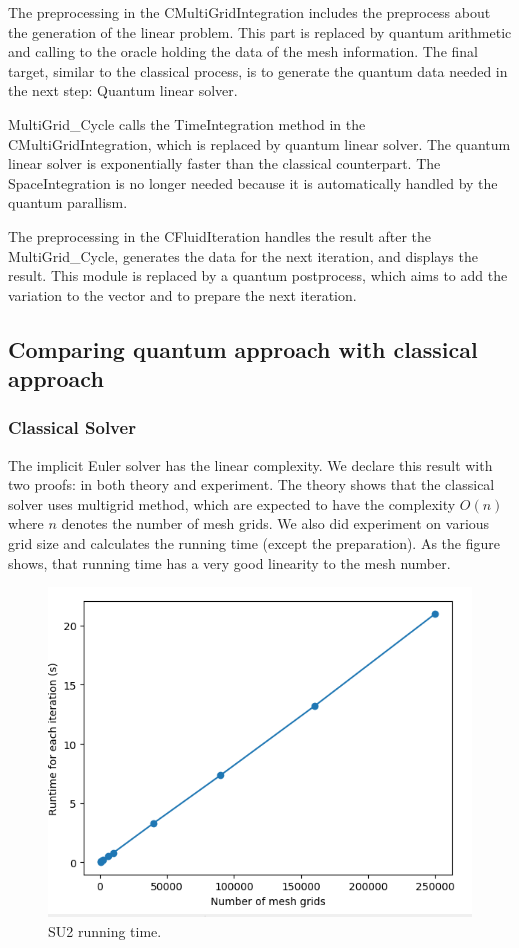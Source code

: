 \documentclass[%
 reprint,
 amsmath,amssymb,
pra,
]{revtex4-1}
\begin{document}
The preprocessing in the CMultiGridIntegration includes the preprocess about the generation of the linear problem. This part is replaced by quantum arithmetic and calling to the oracle holding the data of the mesh information. The final target, similar to the classical process, is to generate the quantum data needed in the next step: Quantum linear solver.

MultiGrid\_Cycle calls the TimeIntegration method in the CMultiGridIntegration, which is replaced by quantum linear solver. The quantum linear solver is exponentially faster than the classical counterpart. The SpaceIntegration is no longer needed because it is automatically handled by the quantum parallism.

The preprocessing in the CFluidIteration handles the result after the MultiGrid\_Cycle, generates the data for the next iteration, and displays the result. This module is replaced by a quantum postprocess, which aims to add the variation to the vector and to prepare the next iteration. 

\subsection{Comparing quantum approach with classical approach}

\subsubsection{Classical Solver}

The implicit Euler solver has the linear complexity. We declare this result with two proofs: in both theory and experiment. The theory shows that the classical solver uses multigrid method, which are expected to have the complexity $O(n)$ where $n$ denotes the number of mesh grids. We also did experiment on various grid size and calculates the running time (except the preparation). As the figure shows, that running time has a very good linearity to the mesh number.
\begin{figure} 
\centering
\includegraphics[width=.48\linewidth]{Fig/su2_speed.png}
\caption{SU2 running time.} \label{su2Speed}
\end{figure}
\end{document}
